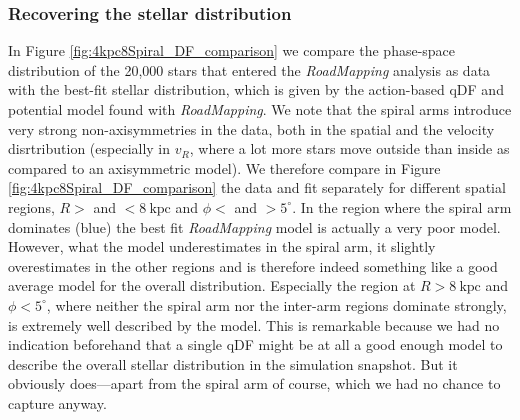 \documentclass[iop,revtex4,numberedappendix,appendixfloats]{emulateapj}
\newcommand{\RM}{{\sl RoadMapping}}
\begin{document}
\subsubsection{Recovering the stellar distribution}

In Figure \ref{fig:4kpc8Spiral_DF_comparison} we compare the phase-space distribution of the 20,000 stars that entered the \RM{} analysis as data with the best-fit stellar distribution, which is given by the action-based qDF and potential model found with \RM{}. We note that the spiral arms introduce very strong non-axisymmetries in the data, both in the spatial and the velocity disrtribution (especially in $v_R$, where a lot more stars move outside than inside as compared to an axisymmetric model). We therefore compare in Figure \ref{fig:4kpc8Spiral_DF_comparison} the data and fit separately for different spatial regions, $R>$ and $<8~\text{kpc}$ and $\phi<$ and $>5^\circ$. In the region where the spiral arm dominates (blue) the best fit \RM{} model is actually a very poor model. However, what the model underestimates in the spiral arm, it slightly overestimates in the other regions and is therefore indeed something like a good average model for the overall distribution. Especially the region at $R>8~\text{kpc}$ and $\phi<5^\circ$, where neither the spiral arm nor the inter-arm regions dominate strongly, is extremely well described by the model. This is remarkable because we had no indication beforehand that a single qDF might be at all a good enough model to describe the overall stellar distribution in the simulation snapshot. But it obviously does---apart from the spiral arm of course, which we had no chance to capture anyway.
\end{document}
